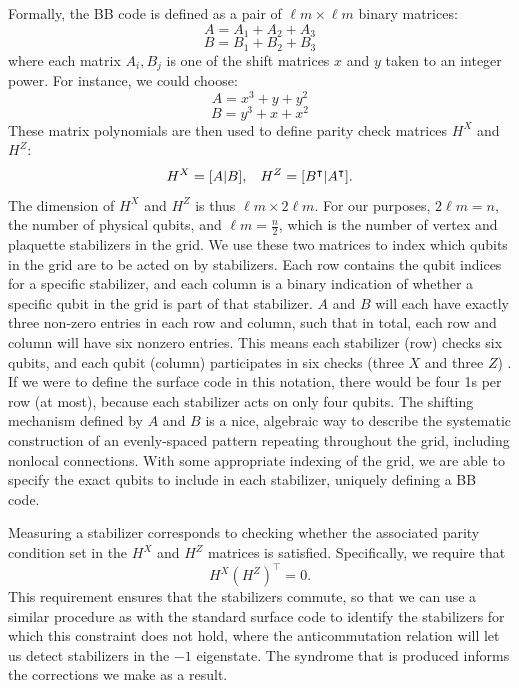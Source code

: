 Formally, the BB code is defined as a pair of $\ell m \times \ell m$ binary matrices:
\[A = A_1 + A_2 + A_3\]
\[B = B_1 + B_2 + B_3\]
where each matrix $A_i, B_j$ is one of the shift matrices $x$ and $y$ taken to an integer power. For instance, we could choose:
\[A= x^3 + y + y^2\]
\[B= y^3 + x + x^2\]
These matrix polynomials are then used to define parity check matrices $H^X$ and $H^Z$:
\[H^X = [A | B], \hspace{0.3cm} H^Z = [B^\intercal | A^\intercal].\]
The dimension of $H^X$ and $H^Z$ is thus $\ell m \times 2 \ell m$. For our purposes, $2 \ell m = n$, the number of physical qubits, and $ \ell m = \frac{n}{2}$, which is the number of vertex and plaquette stabilizers in the grid. 
We use these two matrices to index which qubits in the grid are to be acted on by stabilizers. Each row contains the qubit indices for a specific stabilizer, and each column is a binary indication of whether a specific qubit in the grid is part of that stabilizer. $A$ and $B$ will each have exactly three non-zero entries in each row and column, such that in total, each row and column will have six nonzero entries. This means each stabilizer (row) checks six qubits, and each qubit (column) participates in six checks (three $X$ and three $Z$) \cite{Bravyi2024}.
If we were to define the surface code in this notation, there would be four 1s per row (at most), because each stabilizer acts on only four qubits. The shifting mechanism defined by $A$ and $B$ is a nice, algebraic way to describe the systematic construction of an evenly-spaced pattern repeating throughout the grid, including nonlocal connections. With some appropriate indexing of the grid, we are able to specify the exact qubits to include in each stabilizer, uniquely defining a BB code.

Measuring a stabilizer corresponds to checking whether the associated parity condition set in the $H^X$ and $H^Z$ matrices is satisfied. Specifically, we require that
\[
H^X (H^Z)^\intercal = 0.\]
This requirement ensures that the stabilizers commute, so that we can use a similar procedure as with the standard surface code to identify the stabilizers for which this constraint does not hold, where the anticommutation relation will let us detect stabilizers in the $-1$ eigenstate. The syndrome that is produced informs the corrections we make as a result.


